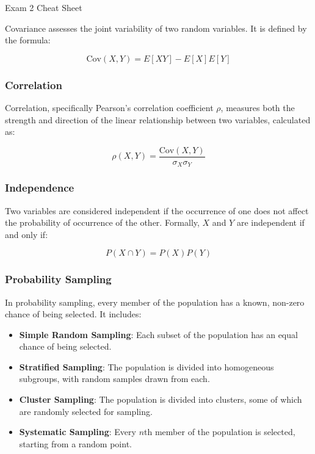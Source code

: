 \begin{cheatsheet}{Exam 2 Cheat Sheet}
{        Covariance assesses the joint variability of two random variables. It is defined by the formula:
    
        \begin{equation*}
            \text{Cov}(X, Y) = E[XY] - E[X]E[Y]
        \end{equation*}
    
        \subsubsection*{Correlation}
    
        Correlation, specifically Pearson's correlation coefficient $\rho$, measures both the strength and direction of the linear relationship between two variables, calculated as:
    
        \begin{equation*}
            \rho(X,Y) = \frac{\text{Cov}(X, Y)}{\sigma_X \sigma_Y}
        \end{equation*}
    
        \subsubsection*{Independence}
    
        Two variables are considered independent if the occurrence of one does not affect the probability of occurrence of the other. Formally, $X$ and $Y$ are independent if and only if:
    
        \begin{equation*}
            P(X \cap Y) = P(X)P(Y)
        \end{equation*}
    
        \subsubsection*{Probability Sampling}
        
        In probability sampling, every member of the population has a known, non-zero chance of being selected. It includes:
        
        \begin{itemize}
            \item \textbf{Simple Random Sampling}: Each subset of the population has an equal chance of being selected.
            \item \textbf{Stratified Sampling}: The population is divided into homogeneous subgroups, with random samples drawn from each.
            \item \textbf{Cluster Sampling}: The population is divided into clusters, some of which are randomly selected for sampling.
            \item \textbf{Systematic Sampling}: Every $n$th member of the population is selected, starting from a random point.
        \end{itemize}
        
}
\end{cheatsheet}
